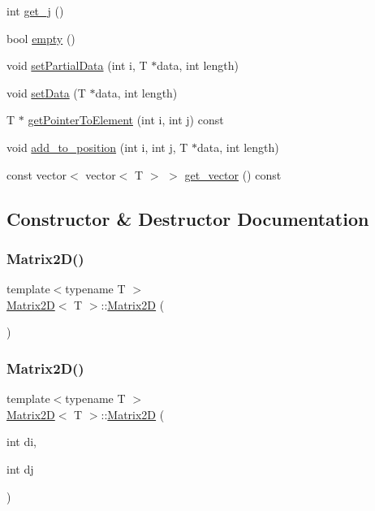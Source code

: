 \begin{DoxyCompactItemize}
\item 
int \mbox{\hyperlink{classMatrix2D_a30918dfce713408a9b3188bea33dbb57}{get\+\_\+j}} ()
\item 
bool \mbox{\hyperlink{classMatrix2D_a5fd8ff857d4554c8fed6ca1ca2f1e87d}{empty}} ()
\item 
void \mbox{\hyperlink{classMatrix2D_a4c959b3c3807e9ca4d8d62f3e516b933}{set\+Partial\+Data}} (int i, T $\ast$data, int length)
\item 
void \mbox{\hyperlink{classMatrix2D_a28515c515652637734a22a3440e80258}{set\+Data}} (T $\ast$data, int length)
\item 
T $\ast$ \mbox{\hyperlink{classMatrix2D_ac3d6fbe385374e65ce00a34be5a7d323}{get\+Pointer\+To\+Element}} (int i, int j) const
\item 
void \mbox{\hyperlink{classMatrix2D_a2bd34bc1808af36aa3dce5af143ce304}{add\+\_\+to\+\_\+position}} (int i, int j, T $\ast$data, int length)
\item 
const vector$<$ vector$<$ T $>$ $>$ \mbox{\hyperlink{classMatrix2D_a2cd319270ca890e47dad636b9af34a11}{get\+\_\+vector}} () const
\end{DoxyCompactItemize}


\subsection{Constructor \& Destructor Documentation}
\mbox{\label{classMatrix2D_a950bb2aa76c86e057d91f430d5a27b57}} 
\subsubsection{\texorpdfstring{Matrix2\+D()}{Matrix2D()}\hspace{0.1cm}{\footnotesize\ttfamily [1/3]}}
{\footnotesize\ttfamily template$<$typename T $>$ \\
\mbox{\hyperlink{classMatrix2D}{Matrix2D}}$<$ T $>$\+::\mbox{\hyperlink{classMatrix2D}{Matrix2D}} (\begin{DoxyParamCaption}{ }\end{DoxyParamCaption})}

\mbox{\label{classMatrix2D_ac93acc71341e612cf8b23d4308c561f8}} 
\subsubsection{\texorpdfstring{Matrix2\+D()}{Matrix2D()}\hspace{0.1cm}{\footnotesize\ttfamily [2/3]}}
{\footnotesize\ttfamily template$<$typename T $>$ \\
\mbox{\hyperlink{classMatrix2D}{Matrix2D}}$<$ T $>$\+::\mbox{\hyperlink{classMatrix2D}{Matrix2D}} (\begin{DoxyParamCaption}\item[{int}]{di,  }\item[{int}]{dj }\end{DoxyParamCaption})}

